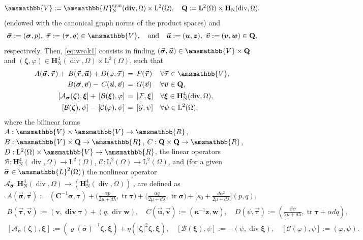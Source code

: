 \documentclass[fleqn,a4paper]{cas-sc}
\newcommand\qan{\quad\hbox{and}\quad}
\newcommand\vdiv{\mathop{\mathrm{div}}\nolimits}
\newcommand\bdiv{\mathop{\mathbf{div}}\nolimits}
\newcommand\tr{\mathop{\mathrm{tr}}\nolimits}
\newcommand{\bC}{\mathbf{C}}
\newcommand{\bbR}{\amsmathbb{R}}
\newcommand\RR{\bbR}
\newcommand{\bu}{\boldsymbol{u}}
\newcommand{\bv}{\boldsymbol{v}}
\newcommand{\bw}{\boldsymbol{w}}
\newcommand{\bz}{\boldsymbol{z}}
\newcommand{\bkappa}{\boldsymbol{\kappa}}
\newcommand{\bxi}{\boldsymbol{\xi}}
\newcommand{\bzeta}{\boldsymbol{\zeta}}
\newcommand{\0}{\boldsymbol{0}}
\newcommand\cA{\mathcal{A}}
\newcommand\cB{\mathcal{B}}
\newcommand\cC{\mathcal{C}}
\newcommand\cG{\mathcal{G}}
\newcommand\cF{\mathcal{F}}
\newcommand\bQ{\mathbf{Q}}
\newcommand\bbV{\amsmathbb{V}}
\newcommand\bbH{\amsmathbb{H}}
\newcommand\bH{\mathbf{H}}
\newcommand\bL{\mathbf{L}}
\newcommand\rL{\mathrm{L}}
\newcommand\bbL{\amsmathbb{L}}
\newcommand\bsigma{\boldsymbol{\sigma}}
\newcommand\btau{\boldsymbol{\tau}}
\numberwithin{equation}{section}
\numberwithin{figure}{section}
\begin{document}
\[\bbV:= \bbH^{\mathrm{sym}}_{\mathrm{N}}(\bdiv,\Omega)\times \rL^2(\Omega), \quad \bQ:= \bL^2(\Omega)\times \bH_{\mathrm{N}}(\vdiv,\Omega), \]
(endowed with the canonical graph norms of the product spaces) and 
 \[    \vec{\bsigma} := (\bsigma, p), \  \vec{\btau} := (\btau, q) \in \bbV, \qan \vec{\bu} := (\bu, \bz), \  \vec{\bv} := (\bv, \bw) \in \bQ,\]
respectively. Then, \eqref{eq:weak1} consists in finding  $(\vec{\bsigma}, \vec{\bu}) \in \bbV \times \bQ$ and $( \bzeta, \varphi) \in  \bH^4_{\mathrm{N}}(\vdiv,\Omega)\times \rL^2(\Omega)$, such that 
\begin{subequations}\label{eq:weak2}
    \begin{align}
         A(\vec{\bsigma}, \vec{\btau})+\,B(\vec{\btau}, \vec{\bu}) + D(\varphi, \vec{\btau}) &   \, =\, F(\vec{\btau})  &&\forall \vec{\btau} \in \bbV,\\
    B(\vec{\bsigma},  \vec{\bv}) -\,C(\vec{\bu}, \vec{\bv}) &  \,=\, G(\vec{\bv})&&\forall \vec{\bv} \in \bQ,  \\ 
    [\cA_{\bsigma}(\bzeta), \bxi]+\,[\cB(\bxi), \varphi] &   \, =\, [\cF,\bxi] &&\forall \bxi \in \bH_{\mathrm{N}}^{4}(\vdiv,\Omega), \label{eq:weak-diff-1}  \\
   [\cB(\bzeta),  \psi]-\,[\cC(\varphi), \psi] &  \,=\, [\cG,\psi] &&\forall \psi \in \rL^2(\Omega), \label{eq:weak-diff-2}  
    \end{align}
\end{subequations}
where the bilinear forms $A:\bbV\times\bbV\to\RR$, $B:\bbV\times\bQ\to\RR$, $C:\bQ\times\bQ\to\RR$, {$D:\rL^2(\Omega) \times \bbV \to \RR$}, the linear operators  $\cB:  \bH^{4}_{\mathrm{N}}(\vdiv,\Omega) \to \rL^2(\Omega)$, $\cC:\rL^2(\Omega)\to \rL^2(\Omega)$, and (for a given $\widehat{\bsigma} \in \bbL^2(\Omega)$) the nonlinear operator $\cA_{\widehat{\bsigma}}:\bH^{4}_{\mathrm{N}}(\vdiv,\Omega)\to (\bH^{4}_{\mathrm{N}}(\vdiv,\Omega))^{\prime}$, are defined as 
\begin{gather*}
   A(\vec{\bsigma}, \vec{\btau}) := (\bC^{-1}\bsigma, \btau) +  \bigl(\frac{\alpha p}{2\mu + d\lambda}, \tr\btau \bigr) +  
   \bigl(\frac{\alpha q}{2\mu + d\lambda}, \tr\bsigma \bigr) 
   + \biggl[s_0+\frac{d\alpha^2}{2\mu + d\lambda}\biggr]
 ( p,q),\\
  B(\vec{\btau}, \vec{\bv}) := (\bv, \bdiv \btau)+ (q , \vdiv \bw), \quad 
  C(\vec{\bu}, \vec{\bv}):=(\bkappa^{-1}\bz,\bw), \quad 
  D(\psi,\vec{\btau}):= ( \frac{\beta \psi}{2\mu + d\lambda}, \tr\btau + \alpha d q ), \\
 [\cA_{\widehat{\bsigma}}(\bzeta),\bxi]  := (\varrho(\widehat{\bsigma})^{-1}\bzeta,\bxi)+\eta(|\bzeta|^{2}\bzeta, \bxi), \quad  [\cB(\bxi), \psi]:= -(\psi, \vdiv \bxi), \quad  [\cC(\varphi), \psi]:=(\varphi, \psi).
\end{gather*}
\end{document}
